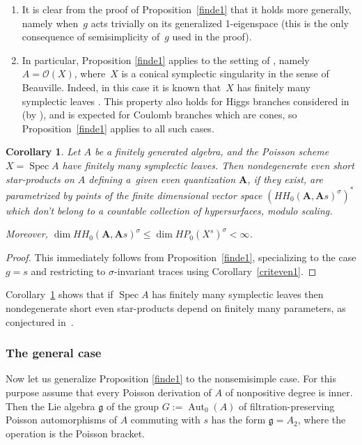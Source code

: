 \documentclass[pdftex]{sigma}
\numberwithin{equation}{section}
\newtheorem{Corollary}[Theorem]{Corollary}
\newcommand{\g}{\mathfrak{g}}
\begin{document}
\begin{Remark} \quad
\begin{enumerate}\itemsep=0pt
\item It is clear from the proof of Proposition~\ref{finde1} that it holds more generally, namely when~$g$ acts trivially on its generalized 1-eigenspace (this is the only consequence of semisimplicity of~$g$ used in the proof).
\item In particular, Proposition \ref{finde1} applies to the setting of \cite{L2}, namely $A=\mathcal{O}(X)$, where~$X$ is a conical symplectic singularity in the sense of Beauville. Indeed, in this case it is known that~$X$ has finitely many symplectic leaves \cite[Theorem~2.3]{Ka}. This property also holds for Higgs branches considered in~\cite{BPR} (by \cite[Section~2.3]{L3}), and is expected for Coulomb branches which are cones, so Proposition~\ref{finde1} applies to all such cases.
\end{enumerate}
\end{Remark}

\begin{Corollary}\label{finde} Let $A$ be a finitely generated algebra, and the Poisson scheme $X=\operatorname{Spec}A$ have finitely many symplectic leaves. Then nondegenerate even short star-products
on $A$ defining a~given even quantization ${{\mathbf A}}$, if they exist, are parametrized by points of
the finite dimensional vector space $(HH_0({{\mathbf A}},{{\mathbf A}}s)^\sigma)^*$ which don't belong to a countable collection of hypersurfaces, modu\-lo scaling.

Moreover, $\dim HH_0({{\mathbf A}},{{\mathbf A}}s)^\sigma\le \dim HP_0(X^s)^\sigma<\infty$.
\end{Corollary}

\begin{proof} This immediately follows from Proposition~\ref{finde1}, specializing to the case $g=s$ and restricting to $\sigma$-invariant traces using Corollary~\ref{criteven1}.
\end{proof}

Corollary~\ref{finde} shows that if $\operatorname{Spec}A$ has finitely many symplectic leaves
then nondegenerate short even star-products depend on finitely many parameters, as conjectured in~\cite{BPR}.

\subsubsection{The general case}
Now let us generalize Proposition \ref{finde1} to the nonsemisimple case. For this purpose assume that every Poisson derivation of $A$ of nonpositive degree is inner. Then the Lie algebra $\g$ of the group
$G:=\operatorname{Aut}_0(A)$ of filtration-preserving Poisson automorphisms of $A$ commuting with $s$ has the form $\g=A_2$, where the operation is the Poisson bracket.
\end{document}
